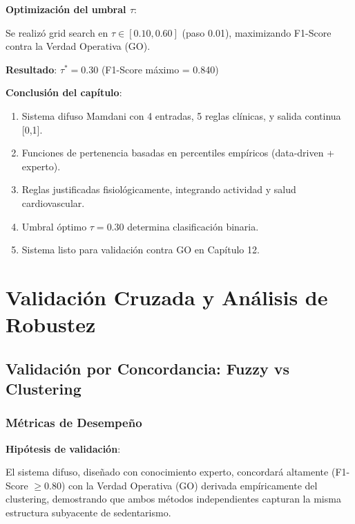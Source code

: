 \documentclass[12pt,letterpaper,twoside]{report}
\begin{document}
\begin{decisionbox}
\textbf{Optimización del umbral $\tau$}:

Se realizó grid search en $\tau \in [0.10, 0.60]$ (paso 0.01), maximizando F1-Score contra la Verdad Operativa (GO).

\textbf{Resultado}: $\tau^* = 0.30$ (F1-Score máximo = 0.840)
\end{decisionbox}

\begin{conclusionbox}
\textbf{Conclusión del capítulo}:

\begin{enumerate}[noitemsep]
    \item Sistema difuso Mamdani con 4 entradas, 5 reglas clínicas, y salida continua [0,1].
    \item Funciones de pertenencia basadas en percentiles empíricos (data-driven + experto).
    \item Reglas justificadas fisiológicamente, integrando actividad y salud cardiovascular.
    \item Umbral óptimo $\tau=0.30$ determina clasificación binaria.
    \item Sistema listo para validación contra GO en Capítulo 12.
\end{enumerate}
\end{conclusionbox}

\chapter{Validación Cruzada y Análisis de Robustez}

\section{Validación por Concordancia: Fuzzy vs Clustering}

\subsection{Métricas de Desempeño}

\begin{hipotesisbox}
\textbf{Hipótesis de validación}:

El sistema difuso, diseñado con conocimiento experto, concordará altamente (F1-Score $\geq 0.80$) con la Verdad Operativa (GO) derivada empíricamente del clustering, demostrando que ambos métodos independientes capturan la misma estructura subyacente de sedentarismo.
\end{hipotesisbox}
\end{document}
